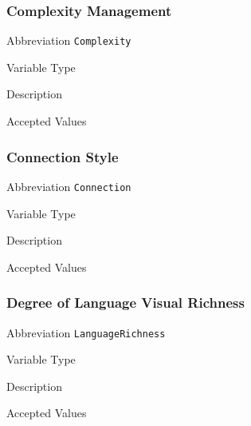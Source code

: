 \subsubsection{Complexity Management}
\label{subsec:complexity}

\begin{AlignedDesc}
  \item[Abbreviation] \texttt{Complexity}

  \item[Variable Type]

  \item[Description]

  \item[Accepted Values]

  \begin{AlignedDesc}
    \item[\textellipsis]
  \end{AlignedDesc}

\end{AlignedDesc}

\subsubsection{Connection Style}
\label{subsec:connection}

\begin{AlignedDesc}
  \item[Abbreviation] \texttt{Connection}

  \item[Variable Type]

  \item[Description]

  \item[Accepted Values]

  \begin{AlignedDesc}
    \item[\textellipsis]
  \end{AlignedDesc}

\end{AlignedDesc}

\subsubsection{Degree of Language Visual Richness}
\label{subsec:languagerichness}

\begin{AlignedDesc}
  \item[Abbreviation] \texttt{LanguageRichness}

  \item[Variable Type]

  \item[Description]

  \item[Accepted Values]

  \begin{AlignedDesc}
    \item[\textellipsis]
  \end{AlignedDesc}

\end{AlignedDesc}


